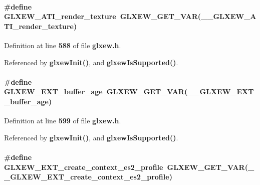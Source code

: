 \paragraph[{G\+L\+X\+E\+W\+\_\+\+A\+T\+I\+\_\+render\+\_\+texture}]{\setlength{\rightskip}{0pt plus 5cm}\#define G\+L\+X\+E\+W\+\_\+\+A\+T\+I\+\_\+render\+\_\+texture~{\bf G\+L\+X\+E\+W\+\_\+\+G\+E\+T\+\_\+\+V\+AR}({\bf \+\_\+\+\_\+\+G\+L\+X\+E\+W\+\_\+\+A\+T\+I\+\_\+render\+\_\+texture})}\label{glxew_8h_aff4e0bd9a08ea2cca8b1ba8d915608e0}


Definition at line {\bf 588} of file {\bf glxew.\+h}.



Referenced by {\bf glxew\+Init()}, and {\bf glxew\+Is\+Supported()}.

\paragraph[{G\+L\+X\+E\+W\+\_\+\+E\+X\+T\+\_\+buffer\+\_\+age}]{\setlength{\rightskip}{0pt plus 5cm}\#define G\+L\+X\+E\+W\+\_\+\+E\+X\+T\+\_\+buffer\+\_\+age~{\bf G\+L\+X\+E\+W\+\_\+\+G\+E\+T\+\_\+\+V\+AR}({\bf \+\_\+\+\_\+\+G\+L\+X\+E\+W\+\_\+\+E\+X\+T\+\_\+buffer\+\_\+age})}\label{glxew_8h_a92d0fb11e07d5d00b37e563b49c5bb19}


Definition at line {\bf 599} of file {\bf glxew.\+h}.



Referenced by {\bf glxew\+Init()}, and {\bf glxew\+Is\+Supported()}.

\paragraph[{G\+L\+X\+E\+W\+\_\+\+E\+X\+T\+\_\+create\+\_\+context\+\_\+es2\+\_\+profile}]{\setlength{\rightskip}{0pt plus 5cm}\#define G\+L\+X\+E\+W\+\_\+\+E\+X\+T\+\_\+create\+\_\+context\+\_\+es2\+\_\+profile~{\bf G\+L\+X\+E\+W\+\_\+\+G\+E\+T\+\_\+\+V\+AR}({\bf \+\_\+\+\_\+\+G\+L\+X\+E\+W\+\_\+\+E\+X\+T\+\_\+create\+\_\+context\+\_\+es2\+\_\+profile})}\label{glxew_8h_af59e7315314e2d275ef401c0d193ae1a}


